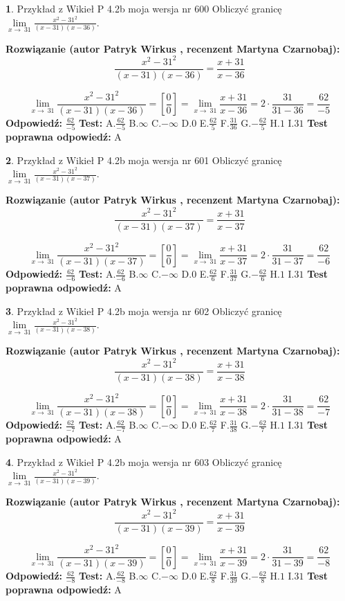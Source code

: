 \documentclass[12pt, a4paper]{article}
\theoremstyle{definition} %
\newtheorem{zad}{}
\newcommand{\zadStart}[1]{\begin{zad}#1\newline}
\newcommand{\zadStop}{\end{zad}}
\newcommand{\rozwStart}[2]{\noindent \textbf{Rozwiązanie (autor #1 , recenzent #2): }\newline}
\newcommand{\rozwStop}{\newline}
\newcommand{\odpStart}{\noindent \textbf{Odpowiedź:}\newline}
\newcommand{\odpStop}{\newline}
\newcommand{\testStart}{\noindent \textbf{Test:}\newline}
\newcommand{\testStop}{\newline}
\newcommand{\kluczStart}{\noindent \textbf{Test poprawna odpowiedź:}\newline}
\newcommand{\kluczStop}{\newline}
\begin{document}
\zadStart{Przykład z Wikieł P 4.2b moja wersja nr 600}
Obliczyć granicę $\lim\limits_{x\to\ 31}\frac{x^{2}-31^{2}}{(x-31)(x-36)}$.
\zadStop
\rozwStart{Patryk Wirkus}{Martyna Czarnobaj}
$$\frac{x^{2}-31^{2}}{(x-31)(x-36)}=\frac{x+31}{x-36}$$

$$\lim\limits_{x\to\ 31}\frac{x^{2}-31^{2}}{(x-31)(x-36)}=[\frac{0}{0}]=\lim\limits_{x\to\ 31}\frac{x+31}{x-36}=2 \cdot \frac{31}{31-36} = \frac{62}{-5}$$
\rozwStop
\odpStart
$\frac{62}{-5}$
\odpStop
\testStart
A.$\frac{62}{-5}$
B.$\infty$
C.$-\infty$
D.$0$
E.$\frac{62}{5}$
F.$\frac{31}{36}$
G.$-\frac{62}{5}$
H.$1$
I.$31$
\testStop
\kluczStart
A
\kluczStop



\zadStart{Przykład z Wikieł P 4.2b moja wersja nr 601}
Obliczyć granicę $\lim\limits_{x\to\ 31}\frac{x^{2}-31^{2}}{(x-31)(x-37)}$.
\zadStop
\rozwStart{Patryk Wirkus}{Martyna Czarnobaj}
$$\frac{x^{2}-31^{2}}{(x-31)(x-37)}=\frac{x+31}{x-37}$$

$$\lim\limits_{x\to\ 31}\frac{x^{2}-31^{2}}{(x-31)(x-37)}=[\frac{0}{0}]=\lim\limits_{x\to\ 31}\frac{x+31}{x-37}=2 \cdot \frac{31}{31-37} = \frac{62}{-6}$$
\rozwStop
\odpStart
$\frac{62}{-6}$
\odpStop
\testStart
A.$\frac{62}{-6}$
B.$\infty$
C.$-\infty$
D.$0$
E.$\frac{62}{6}$
F.$\frac{31}{37}$
G.$-\frac{62}{6}$
H.$1$
I.$31$
\testStop
\kluczStart
A
\kluczStop



\zadStart{Przykład z Wikieł P 4.2b moja wersja nr 602}
Obliczyć granicę $\lim\limits_{x\to\ 31}\frac{x^{2}-31^{2}}{(x-31)(x-38)}$.
\zadStop
\rozwStart{Patryk Wirkus}{Martyna Czarnobaj}
$$\frac{x^{2}-31^{2}}{(x-31)(x-38)}=\frac{x+31}{x-38}$$

$$\lim\limits_{x\to\ 31}\frac{x^{2}-31^{2}}{(x-31)(x-38)}=[\frac{0}{0}]=\lim\limits_{x\to\ 31}\frac{x+31}{x-38}=2 \cdot \frac{31}{31-38} = \frac{62}{-7}$$
\rozwStop
\odpStart
$\frac{62}{-7}$
\odpStop
\testStart
A.$\frac{62}{-7}$
B.$\infty$
C.$-\infty$
D.$0$
E.$\frac{62}{7}$
F.$\frac{31}{38}$
G.$-\frac{62}{7}$
H.$1$
I.$31$
\testStop
\kluczStart
A
\kluczStop



\zadStart{Przykład z Wikieł P 4.2b moja wersja nr 603}
Obliczyć granicę $\lim\limits_{x\to\ 31}\frac{x^{2}-31^{2}}{(x-31)(x-39)}$.
\zadStop
\rozwStart{Patryk Wirkus}{Martyna Czarnobaj}
$$\frac{x^{2}-31^{2}}{(x-31)(x-39)}=\frac{x+31}{x-39}$$

$$\lim\limits_{x\to\ 31}\frac{x^{2}-31^{2}}{(x-31)(x-39)}=[\frac{0}{0}]=\lim\limits_{x\to\ 31}\frac{x+31}{x-39}=2 \cdot \frac{31}{31-39} = \frac{62}{-8}$$
\rozwStop
\odpStart
$\frac{62}{-8}$
\odpStop
\testStart
A.$\frac{62}{-8}$
B.$\infty$
C.$-\infty$
D.$0$
E.$\frac{62}{8}$
F.$\frac{31}{39}$
G.$-\frac{62}{8}$
H.$1$
I.$31$
\testStop
\kluczStart
A
\kluczStop
\end{document}
